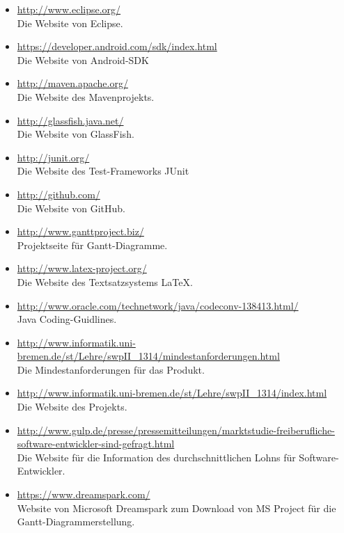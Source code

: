 \documentclass[fontsize=12pt,paper=a4,twoside]{scrartcl}
\begin{document}
\begin{itemize}
\item{\url{http://www.eclipse.org/}\\ Die Website von Eclipse.} \item{\url{https://developer.android.com/sdk/index.html}\\ Die Website von Android-SDK}
\item{\url{http://maven.apache.org/}\\ Die Website des Mavenprojekts.}
\item{\url{http://glassfish.java.net/}\\ Die Website von GlassFish.}
\item{\url{http://junit.org/}\\ Die Website des Test-Frameworks JUnit}
\item{\url{http://github.com/}\\ Die Website von GitHub.}
\item{\url{http://www.ganttproject.biz/}\\ Projektseite für Gantt-Diagramme.}
\item{\url{http://www.latex-project.org/}\\ Die Website des Textsatzsystems \LaTeX.}
\item{\url{http://www.oracle.com/technetwork/java/codeconv-138413.html/}\\ Java Coding-Guidlines.}
\item{\url{http://www.informatik.uni-bremen.de/st/Lehre/swpII_1314/mindestanforderungen.html}\\ Die Mindestanforderungen für das Produkt.}
\item{\url{http://www.informatik.uni-bremen.de/st/Lehre/swpII_1314/index.html}\\ Die Website des Projekts.}
\item{\url{http://www.gulp.de/presse/pressemitteilungen/marktstudie-freiberufliche-software-entwickler-sind-gefragt.html}\\ Die Website für die Information des durchschnittlichen Lohns für Software-Entwickler.}
\item{\url{https://www.dreamspark.com/}\\Website von Microsoft Dreamspark zum Download von MS Project für die Gantt-Diagrammerstellung.}


\end{itemize}

%
%
%
%
\end{document}
